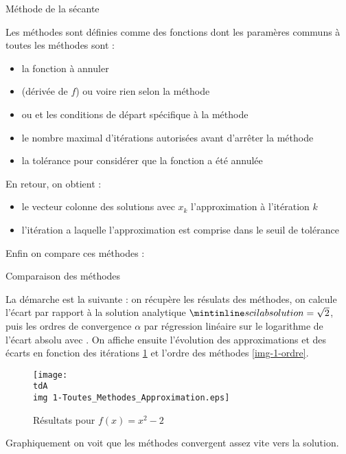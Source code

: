 		\begin{listing}[H]
		\label{code-1-secante}
			\caption{Méthode de la sécante}
		\end{listing}

		Les méthodes sont définies comme des fonctions dont les paramères communs à toutes les méthodes sont :
		\begin{itemize}
			\item {} la fonction à annuler
			\item {} (dérivée de $f$) ou  voire rien selon la méthode
			\item {} ou  et  les conditions de départ spécifique à la méthode
			\item {} le nombre maximal d'itérations autorisées avant d'arrêter la méthode
			\item {} la tolérance pour considérer que la fonction a été annulée
		\end{itemize}

		En retour, on obtient :
		\begin{itemize}
			\item{} le vecteur colonne des solutions avec $x_k$ l'approximation à l'itération $k$
			\item{} l'itération a laquelle l'approximation est comprise dans le seuil de tolérance
		\end{itemize}

		Enfin on compare ces méthodes :
		\begin{listing}[H]
		\label{code-1-comparaison}
			\caption{Comparaison des méthodes}
		\end{listing}

		La démarche est la suivante :
		on récupère les résulats des méthodes, on calcule l'écart par rapport à la solution analytique $\code{solution} = \sqrt{2}$, puis les ordres de convergence $\alpha$ par régression linéaire sur le logarithme de l'écart absolu avec . On affiche ensuite l'évolution des approximations et des écarts en fonction des itérations \ref{img-1-result2} et l'ordre des méthodes \ref{img-1-ordre}.

		\begin{figure}[H]
			\centering
			\texttt{[image: \\tdA\\img 1-Toutes\_Methodes\_Approximation.eps]}
			\caption{Résultats pour $f(x) = x^2 -2$}
			\label{img-1-result2}
		\end{figure}
		Graphiquement on voit que les méthodes convergent assez vite vers la solution.

